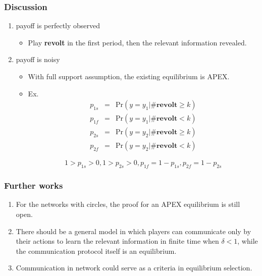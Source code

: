 \documentclass[10pt]{beamer}
\begin{document}
\begin{frame}
\frametitle{Discussion}

\begin{enumerate}

\item payoff is perfectly observed
\begin{itemize}
\item Play \textbf{revolt} in the first period, then the relevant information revealed.

\end{itemize}
\item payoff is noisy
\begin{itemize}
\item With full support assumption, the existing equilibrium is APEX.
\item Ex. 
\begin{eqnarray*}
p_{1s} &=& \mathrm {Pr}(y=y_1|\#\textbf{revolt}\geq k) \\
p_{1f} &=& \mathrm {Pr}(y=y_1|\#\textbf{revolt}< k) \\
p_{2s} &=& \mathrm {Pr}(y=y_2|\#\textbf{revolt}\geq k) \\
p_{2f} &=& \mathrm {Pr}(y=y_2|\#\textbf{revolt}< k) 
\end{eqnarray*}

\begin{equation}
1>p_{1s}>0,1>p_{2s}>0,p_{1f}=1-p_{1s},p_{2f}=1-p_{2s}
\end{equation}
\end{itemize}


\end{enumerate}


\end{frame}





\begin{frame}

\frametitle{Further works}


\begin{enumerate}
\item For the networks with circles, the proof for an APEX equilibrium is still open.
\item There should be a general model in which players can communicate only by their actions to learn the relevant information in finite time when $\delta<1$, while the communication protocol itself is an equilibrium.
\item Communication in network could serve as a criteria in equilibrium selection.  

\end{enumerate}
\end{frame}
\end{document}
